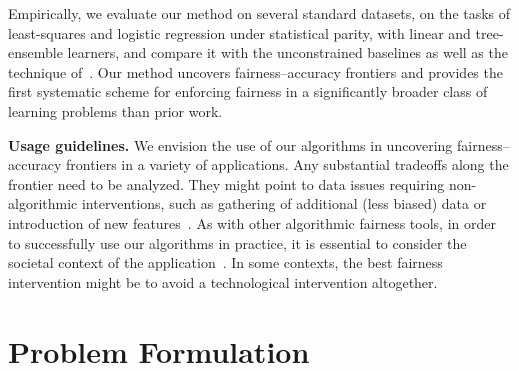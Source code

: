 \documentclass{article}
\begin{document}

Empirically, we evaluate our method on several standard datasets, on the tasks of least-squares and logistic regression under statistical parity, with linear and tree-ensemble learners, and compare it with the unconstrained baselines as well as the technique of~\citet{johnson2016impartial}. Our method uncovers fairness--accuracy frontiers
and provides the first systematic scheme for enforcing fairness in a significantly broader class of learning problems than prior work.

\textbf{Usage guidelines.} We envision the use of our algorithms in uncovering fairness--accuracy frontiers in a variety of applications. %
Any substantial tradeoffs along the frontier need to be analyzed. They might point to data issues requiring non-algorithmic interventions, such as gathering of additional (less biased) data or introduction of new features~\citep{chen2018my}.
%
As with other algorithmic fairness tools, in order to successfully use our algorithms in practice, it is essential to consider the societal context of the application~\cite{selbst2018fairness}.
In some contexts, the best fairness intervention might be to avoid a technological intervention altogether.


\section{Problem Formulation}
\label{sec:setting}
\end{document}
